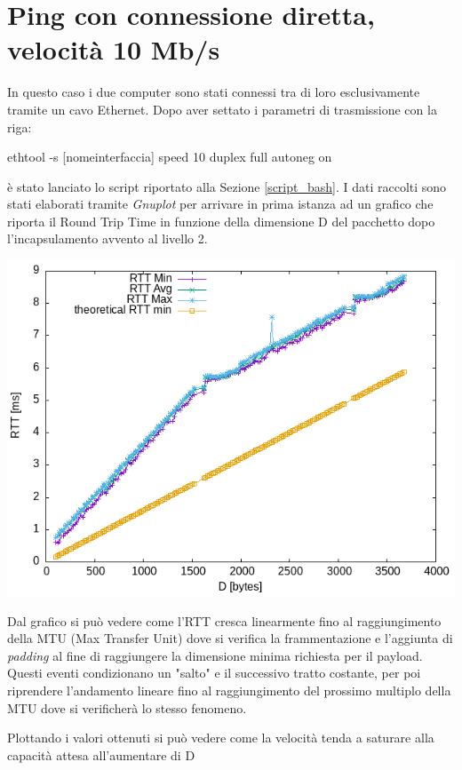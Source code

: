 \documentclass{article}
\begin{document}
\section{Ping con connessione diretta, velocità 10 Mb/s} 
In questo caso i due computer sono stati connessi tra di loro esclusivamente tramite un cavo Ethernet.
Dopo aver settato i parametri di trasmissione con la riga:
\begin{center}
    \textsf{ethtool -s [nomeinterfaccia] speed 10 duplex full autoneg on }
\end{center}
è stato lanciato lo script riportato alla Sezione \ref{script_bash}.
I dati raccolti sono stati elaborati tramite \textit{Gnuplot} per arrivare in prima istanza ad un grafico che riporta il Round Trip Time in funzione della dimensione D del pacchetto dopo l'incapsulamento avvento al livello 2.
\begin{center}
    \includegraphics[scale=0.5]{RTT-10Mbps_Direct}
    \label{RTT_D_10_dir}
\end{center}


Dal grafico si può vedere come l'RTT cresca linearmente fino al raggiungimento della MTU (Max Transfer Unit) dove si verifica la frammentazione e l'aggiunta di \textit{padding} al fine di raggiungere la dimensione minima richiesta per il payload. Questi eventi condizionano un "salto" e il successivo tratto costante, per poi riprendere l'andamento lineare fino al raggiungimento del prossimo multiplo della MTU dove si verificherà lo stesso fenomeno.

Plottando i valori ottenuti si può vedere come la velocità tenda a saturare alla capacità attesa all'aumentare di D
\end{document}
